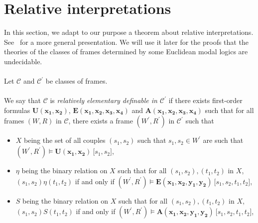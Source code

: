 \documentclass[draft]{article}
\begin{document}
\section{Relative interpretations}\label{section:about:relative:interpretations}
%
%
In this section, we adapt to our purpose a theorem about relative interpretations.
See~\cite[Page~$272$]{Ershov:1980} for a more general presentation.
We will use it later for the proofs that the theories of the classes of frames determined by some Euclidean modal logics are undecidable.
%
%
\\
\\
%
%
Let ${\mathcal C}$ and ${\mathcal C}^{\prime}$ be classes of frames.
%
%
\\
\\
%
%
We say that ${\mathcal C}$ is {\it relatively elementary definable in ${\mathcal C}^{\prime}$}\/ if there exists first-order formulas $\mathbf{U}(\mathbf{x_{1}},\mathbf{x_{2}})$, $\mathbf{E}(\mathbf{x_{1}},\mathbf{x_{2}},\mathbf{x_{3}},\mathbf{x_{4}})$ and $\mathbf{A}(\mathbf{\mathbf{x_{1}},\mathbf{x_{2}},x_{3}},\mathbf{x_{4}})$ such that for all frames $(W,R)$ in ${\mathcal C}$, there exists a frame $(W^{\prime},R^{\prime})$ in ${\mathcal C}^{\prime}$ such that
%
%
\begin{itemize}
%
%
\item $X$ being the set of all couples $(s_{1},s_{2})$ such that $s_{1},s_{2}{\in}W^{\prime}$ are such that $(W^{\prime},R^{\prime}){\models}\mathbf{U}(\mathbf{x_{1}},\mathbf{x_{2}})\ \lbrack s_{1},s_{2}\rbrack$,
%
%
\item $\eta$ being the binary relation on $X$ such that for all $(s_{1},s_{2}),(t_{1},t_{2})$ in $X$, $(s_{1},s_{2})\eta(t_{1},t_{2})$ if and only if $(W^{\prime},R^{\prime}){\models}\mathbf{E}(\mathbf{x_{1}},\mathbf{x_{2}},\mathbf{y_{1}},\mathbf{y_{2}})\ \lbrack s_{1},s_{2},t_{1},t_{2}\rbrack$,
%
%
\item $S$ being the binary relation on $X$ such that for all $(s_{1},s_{2}),(t_{1},t_{2})$ in $X$, $(s_{1},s_{2})S(t_{1},t_{2})$ if and only if $(W^{\prime},R^{\prime}){\models}\mathbf{A}(\mathbf{x_{1}},\mathbf{x_{2}},\mathbf{y_{1}},\mathbf{y_{2}})\ \lbrack s_{1},s_{2},t_{1},t_{2}\rbrack$,
%
%
\end{itemize}
\end{document}
